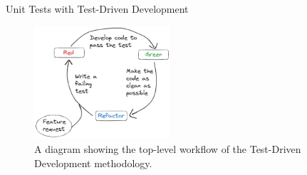 \documentclass[10pt,aspectratio=169]{beamer}
\begin{document}
\begin{frame}{Unit Tests with Test-Driven Development}
    \begin{figure}[H]
        \hspace*{-1cm}
        \includegraphics[width=0.45\textwidth]{images/excalidraw_tdd.png}
        \caption{A diagram showing the top-level workflow of the Test-Driven Development methodology.}
        \label{fig:tdd_workflow}
    \end{figure}
\end{frame}
\end{document}
